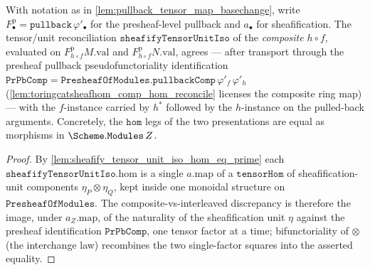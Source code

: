 \begin{lemma}
  \label{lem:sheafify_tensor_unit_iso_comp}
  With notation as in \cref{lem:pullback_tensor_map_basechange}, write \(F^{\mathrm p}_\bullet =
  \mathtt{pullback}\,\varphi'_\bullet\) for the presheaf-level pullback and \(a_\bullet\) for
  sheafification. The tensor/unit reconciliation \(\mathtt{sheafifyTensorUnitIso}\) of the
  \emph{composite} \(h \circ f\), evaluated on \(F^{\mathrm p}_{h\circ f}M.\mathrm{val}\) and
  \(F^{\mathrm p}_{h\circ f}N.\mathrm{val}\), agrees --- after transport through the presheaf
  pullback pseudofunctoriality identification
  \(\mathtt{PrPbComp} = \mathtt{PresheafOfModules.pullbackComp}\,\varphi'_f\,\varphi'_h\)
  (\cref{lem:toringcatsheafhom_comp_hom_reconcile} licenses the composite ring map) --- with the
  \(f\)-instance carried by \(h^{*}\) followed by the \(h\)-instance on the pulled-back arguments.
  Concretely, the \(\mathtt{hom}\) legs of the two presentations are equal as morphisms in
  \(\Scheme.\mathtt{Modules}\,Z\).
\end{lemma}
\begin{proof}
  By \cref{lem:sheafify_tensor_unit_iso_hom_eq_prime} each \(\mathtt{sheafifyTensorUnitIso}.\mathrm{hom}\)
  is a single \(a.\mathrm{map}\) of a \(\mathtt{tensorHom}\) of sheafification-unit components
  \(\eta_P \otimes \eta_Q\), kept inside one monoidal structure on \(\mathtt{PresheafOfModules}\).
  The composite-vs-interleaved discrepancy is therefore the image, under \(a_Z.\mathrm{map}\), of the
  naturality of the sheafification unit \(\eta\) against the presheaf identification \(\mathtt{PrPbComp}\),
  one tensor factor at a time; bifunctoriality of \(\otimes\) (the interchange law) recombines the two
  single-factor squares into the asserted equality.
\end{proof}

